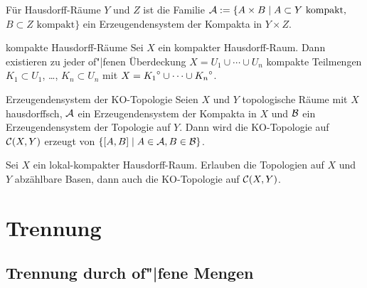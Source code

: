 \begin{Bsp}
    Für Hausdorff-Räume $Y$ und $Z$ ist die Familie
    $\mathcal{A} := \{A \times B \;|\; A \subset Y \text{ kompakt},\;$ \\
    $B \subset Z \text{ kompakt}\}$ ein Erzeugendensystem der Kompakta in
    $Y \times Z$.
\end{Bsp}

\begin{Lemma}{kompakte Hausdorff-Räume}
    Sei $X$ ein kompakter Hausdorff-Raum.
    Dann existieren zu jeder of"|fenen Überdeckung
    $X = U_1 \cup \dotsb \cup U_n$ kompakte Teilmengen $K_1 \subset U_1$,
    \dots, $K_n \subset U_n$ mit
    $X = {K_1}^\circ \cup \dotsb \cup {K_n}^\circ$.
\end{Lemma}

\begin{Satz}{Erzeugendensystem der KO-Topologie}
    Seien $X$ und $Y$ topologische Räume mit $X$ hausdorffsch,
    $\mathcal{A}$ ein Erzeugendensystem der Kompakta in $X$ und
    $\mathcal{B}$ ein Erzeugendensystem der Topologie auf $Y$.
    Dann wird die KO-Topologie auf $\mathcal{C}(X, Y)$ erzeugt von
    $\{[A, B] \;|\; A \in \mathcal{A}, B \in \mathcal{B}\}$.
\end{Satz}

\begin{Kor}
    Sei $X$ ein lokal-kompakter Hausdorff-Raum.
    Erlauben die Topologien auf $X$ und $Y$ abzählbare Basen, dann auch
    die KO-Topologie auf $\mathcal{C}(X, Y)$.
\end{Kor}

\pagebreak

\section{%
    Trennung%
}

\subsection{%
    Trennung durch of"|fene Mengen%
}


